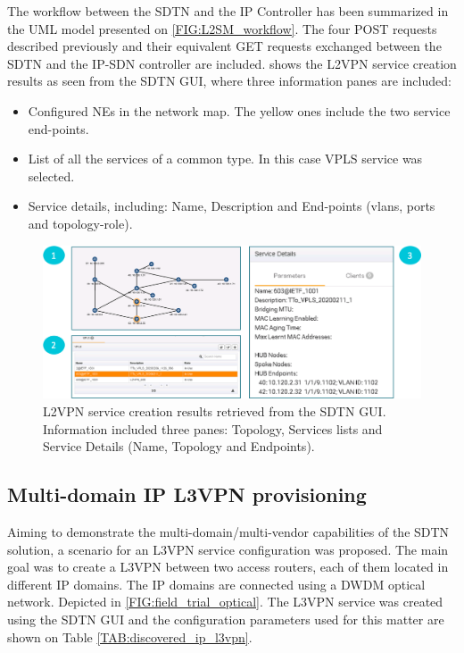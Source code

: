 \documentclass[a4paper,fleqn]{cas-dc}
\begin{document}
The workflow between the SDTN and the IP Controller has been summarized in the UML model presented on \cref{FIG:L2SM_workflow}. The four POST requests described previously and their equivalent GET requests exchanged between the SDTN and the IP-SDN controller are included.  shows the L2VPN service creation results as seen from the SDTN GUI, where three information panes are included: 
\begin{itemize}
    \item Configured NEs in the network map. The yellow ones include the two service end-points.
    \item List of all the services of a common type. In this case VPLS service was selected. 
    \item Service details, including: Name, Description and End-points (vlans, ports and topology-role). 
\end{itemize}

\begin{figure}
	\centering
		\includegraphics[width=\linewidth]{figs/l2vpn_results.png}
	\caption{L2VPN service creation results retrieved from the SDTN GUI. Information included three panes: Topology, Services lists and Service Details (Name, Topology and Endpoints).}
	\label{FIG:L2SM_results}
\end{figure}


\subsection{Multi-domain IP L3VPN provisioning}

Aiming to demonstrate the multi-domain/multi-vendor capabilities of the SDTN solution, a scenario for an L3VPN service configuration was proposed. The main goal was to create a L3VPN between two access routers, each of them located in different IP domains. The IP domains are connected using a DWDM optical network. Depicted in \cref{FIG:field_trial_optical}. The L3VPN service was created using the SDTN GUI and the configuration parameters used for this matter are shown on Table \cref{TAB:discovered_ip_l3vpn}.
\end{document}

